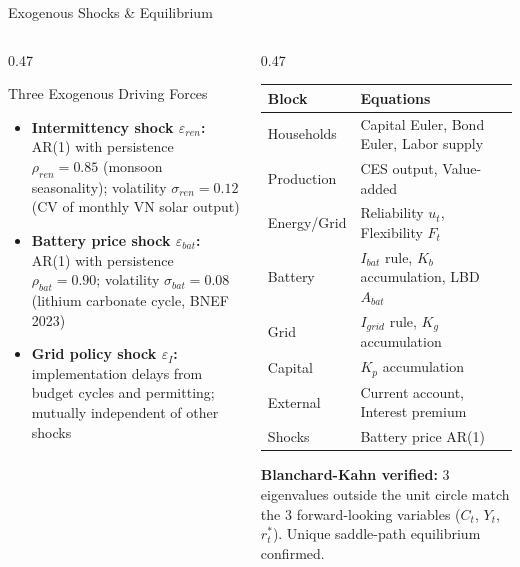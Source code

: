 \documentclass[aspectratio=169,10pt]{beamer}
\newcommand{\fuvhl}[1]{\textcolor{fuvteal}{\textbf{#1}}}
\begin{document}
\begin{frame}{Exogenous Shocks \& Equilibrium}
	\begin{columns}[T]
		\begin{column}{0.47\textwidth}
			\begin{block}{Three Exogenous Driving Forces}
				\begin{itemize}\small
					\item \fuvhl{Intermittency shock $\varepsilon_{ren}$:} AR(1) with persistence $\rho_{ren}=0.85$ (monsoon seasonality); volatility $\sigma_{ren}=0.12$ (CV of monthly VN solar output)
					\item \fuvhl{Battery price shock $\varepsilon_{bat}$:} AR(1) with persistence $\rho_{bat}=0.90$; volatility $\sigma_{bat}=0.08$ (lithium carbonate cycle, BNEF 2023)
					\item \fuvhl{Grid policy shock $\varepsilon_I$:} implementation delays from budget cycles and permitting; mutually independent of other shocks
				\end{itemize}
			\end{block}
		\end{column}
		\begin{column}{0.47\textwidth}
			\begin{keybox}[title={Competitive Equilibrium: 16 Equations, 16 Unknowns}]
				\scriptsize
				\begin{tabular}{@{}ll@{}}
					\toprule
					\textbf{Block} & \textbf{Equations}\\
					\midrule
					Households & Capital Euler, Bond Euler, Labor supply\\
					Production & CES output, Value-added\\
					Energy/Grid & Reliability $u_t$, Flexibility $F_t$\\
					Battery & $I_{bat}$ rule, $K_b$ accumulation, LBD $A_{bat}$\\
					Grid & $I_{grid}$ rule, $K_g$ accumulation\\
					Capital & $K_p$ accumulation\\
					External & Current account, Interest premium\\
					Shocks & Battery price AR(1)\\
					\bottomrule
				\end{tabular}
			\end{keybox}
			\vspace{0.2em}
			\begin{goldbox}
				\scriptsize \textbf{Blanchard-Kahn verified:} 3 eigenvalues outside the unit circle match the 3 forward-looking variables ($C_t$, $Y_t$, $r^*_t$). Unique saddle-path equilibrium confirmed.
			\end{goldbox}
		\end{column}
	\end{columns}
\end{frame}
\end{document}
